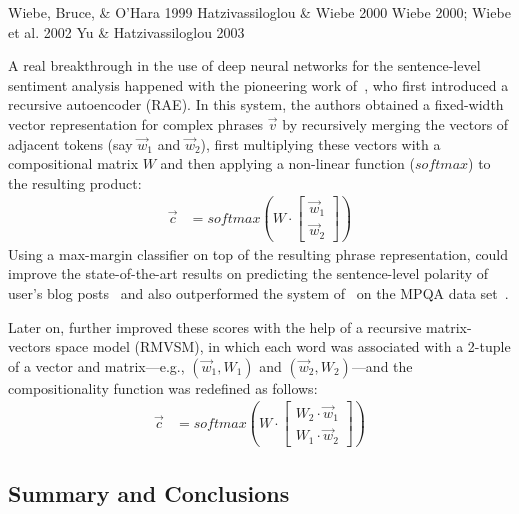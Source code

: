 \citet{Kobayashi:07}
Wiebe, Bruce, \& O'Hara 1999
Hatzivassiloglou \& Wiebe 2000
Wiebe 2000; Wiebe et al. 2002
Yu \& Hatzivassiloglou 2003


\citet{Yessenalina:11}

A real breakthrough in the use of deep neural networks for the
sentence-level sentiment analysis happened with the pioneering work
of~\citet{Socher:11}, who first introduced a recursive autoencoder
(RAE).  In this system, the authors obtained a fixed-width vector
representation for complex phrases $\vec{v}$ by recursively merging
the vectors of adjacent tokens (say $\vec{w}_1$ and $\vec{w}_2$),
first multiplying these vectors with a compositional matrix $W$ and
then applying a non-linear function ($softmax$) to the resulting
product:
\begin{align*}
  \vec{c} &= softmax\left(W\cdot\begin{bmatrix}
  \vec{w}_1\\
  \vec{w}_2
  \end{bmatrix}\right)
\end{align*}
Using a max-margin classifier on top of the resulting phrase
representation, \citet{Socher:11} could improve the state-of-the-art
results on predicting the sentence-level polarity of user's blog
posts~\cite{Potts:10} and also outperformed the system
of~\citet{Nasukawa:03} on the MPQA data set~\cite{Wiebe:05}.

Later on, \citet{Socher:12} further improved these scores with the
help of a recursive matrix-vectors space model (RMVSM), in which each
word was associated with a 2-tuple of a vector and matrix---e.g.,
$(\vec{w}_1, W_1)$ and $(\vec{w}_2, W_2)$---and the compositionality
function was redefined as follows:
\begin{align*}
  \vec{c} &= softmax\left(W\cdot\begin{bmatrix}
  W_2\cdot\vec{w}_1\\
  W_1\cdot\vec{w}_2
  \end{bmatrix}\right)
\end{align*}

\citet{Wang:15}

\subsection{Summary and Conclusions}\label{slsa:subsec:conclusions}
